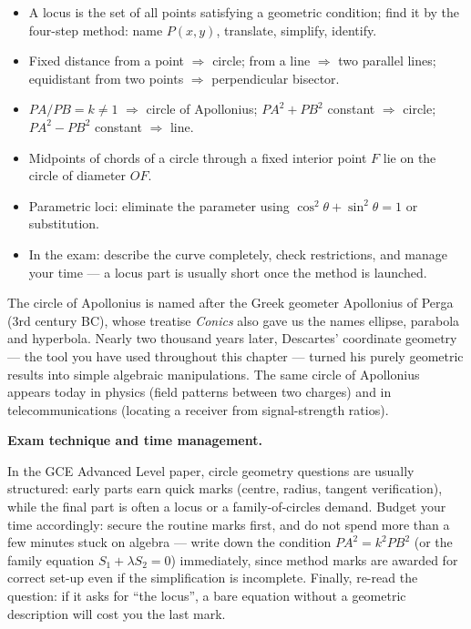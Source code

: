 \documentclass[11pt]{article}
\newcommand{\cle}[1]{{\popxbold\color{popdark}#1}}
\begin{document}
\begin{aretenir}
\begin{itemize}
\item A \cle{locus} is the set of all points satisfying a geometric condition; find it by the four-step method: name $P(x,y)$, translate, simplify, identify.
\item Fixed distance from a point $\Rightarrow$ circle; from a line $\Rightarrow$ two parallel lines; equidistant from two points $\Rightarrow$ perpendicular bisector.
\item $PA/PB = k \neq 1$ $\Rightarrow$ circle of Apollonius; $PA^2+PB^2$ constant $\Rightarrow$ circle; $PA^2-PB^2$ constant $\Rightarrow$ line.
\item Midpoints of chords of a circle through a fixed interior point $F$ lie on the circle of diameter $OF$.
\item Parametric loci: eliminate the parameter using $\cos^2\theta+\sin^2\theta = 1$ or substitution.
\item In the exam: describe the curve completely, check restrictions, and manage your time — a locus part is usually short once the method is launched.
\end{itemize}
\end{aretenir}

\begin{savaistu}
The circle of Apollonius is named after the Greek geometer Apollonius of Perga (3rd century BC), whose treatise \emph{Conics} also gave us the names ellipse, parabola and hyperbola. Nearly two thousand years later, Descartes' coordinate geometry — the tool you have used throughout this chapter — turned his purely geometric results into simple algebraic manipulations. The same circle of Apollonius appears today in physics (field patterns between two charges) and in telecommunications (locating a receiver from signal-strength ratios).
\end{savaistu}

\textbf{Exam technique and time management.}\par
In the GCE Advanced Level paper, circle geometry questions are usually structured: early parts earn quick marks (centre, radius, tangent verification), while the final part is often a locus or a family-of-circles demand. Budget your time accordingly: secure the routine marks first, and do not spend more than a few minutes stuck on algebra — write down the condition $PA^2 = k^2 PB^2$ (or the family equation $S_1 + \lambda S_2 = 0$) immediately, since method marks are awarded for correct set-up even if the simplification is incomplete. Finally, re-read the question: if it asks for ``the locus'', a bare equation without a geometric description will cost you the last mark.
\end{document}
